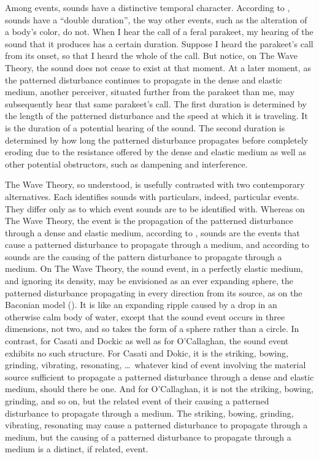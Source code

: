 Among events, sounds have a distinctive temporal character. According to \citet{OShaughnessy:2009aa}, sounds have a ``double duration'', the way other events, such as the alteration of a body's color, do not. When I hear the call of a feral parakeet, my hearing of the sound that it produces has a certain duration. Suppose I heard the parakeet's call from its onset, so that I heard the whole of the call. But notice, on The Wave Theory, the sound does not cease to exist at that moment. At a later moment, as the patterned disturbance continues to propagate in the dense and elastic medium, another perceiver, situated further from the parakeet than me, may subsequently hear that same parakeet's call. The first duration is determined by the length of the patterned disturbance and the speed at which it is traveling. It is the duration of a potential hearing of the sound. The second duration is determined by how long the patterned disturbance propagates before completely eroding due to the resistance offered by the dense and elastic medium as well as other potential obstructors, such as dampening and interference.

The Wave Theory, so understood, is usefully contrasted with two contemporary alternatives. Each identifies sounds with particulars, indeed, particular events. They differ only as to which event sounds are to be identified with. Whereas on The Wave Theory, the event is the propagation of the patterned disturbance through a dense and elastic medium, according to \citet{Casati:1994aa,Casati:2014hw}, sounds are the events that cause a patterned disturbance to propagate through a medium, and according to \citet{OCallaghan:2007xy,OCallaghan:2009aa} sounds are the causing of the pattern disturbance to propagate through a medium. On The Wave Theory, the sound event, in a perfectly elastic medium, and ignoring its density, may be envisioned as an ever expanding sphere, the patterned disturbance propagating in every direction from its source, as on the Baconian model (\citealt{Sorensen:2009aa}). It is like an expanding ripple caused by a drop in an otherwise calm body of water, except that the sound event occurs in three dimensions, not two, and so takes the form of a sphere rather than a circle. In contrast, for Casati and Dockic as well as for O'Callaghan, the sound event exhibits no such structure. For Casati and Dokic, it is the striking, bowing, grinding, vibrating, resonating, \ldots\ whatever kind of event involving the material source sufficient to propagate a patterned disturbance through a dense and elastic medium, should there be one. And for O'Callaghan, it is not the striking, bowing, grinding, and so on, but the related event of their causing a patterned disturbance to propagate through a medium. The striking, bowing, grinding, vibrating, resonating may cause a patterned disturbance to propagate through a medium, but the causing of a patterned disturbance to propagate through a medium is a distinct, if related, event.

